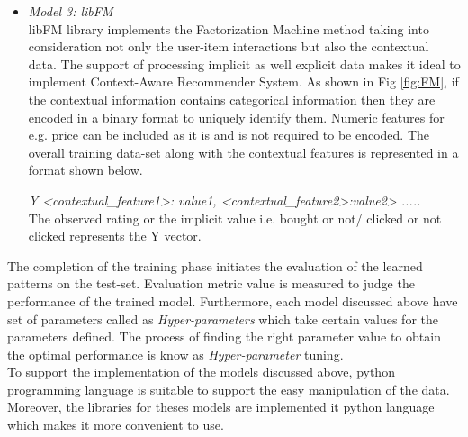 \begin{itemize}
	\item \textit{Model 3: libFM}\\
	libFM library implements the Factorization Machine method taking into consideration not only the user-item interactions but also the contextual data. The support of processing implicit as well explicit data makes it ideal to implement Context-Aware Recommender System. As shown in Fig \ref{fig:FM}, if the contextual information contains categorical information then they are encoded in a binary format to uniquely identify them. Numeric features for e.g. price can be included as it is and is not required to be encoded. The overall training data-set along with the contextual features is represented in a format shown below. 
	   
	   \textit{ Y <contextual{\_}feature1>: value1, <contextual{\_}feature2>:value2> ..... } \\
	   The observed rating or the implicit value i.e. bought or not/ clicked or not clicked represents the Y vector.
	
\end{itemize}

The completion of the training phase initiates the evaluation of the learned patterns on the test-set. Evaluation metric value is measured to judge the performance of the trained model. Furthermore, each model discussed above have set of parameters called as \textit{Hyper-parameters} which take certain values for the parameters defined. The process of finding the right parameter value to obtain the optimal performance is know as \textit{Hyper-parameter} tuning. \\
\Par
To support the implementation of the models discussed above, python programming language is suitable to support the easy manipulation of the data. Moreover, the libraries for theses models are implemented it python language which makes it more convenient to use.



